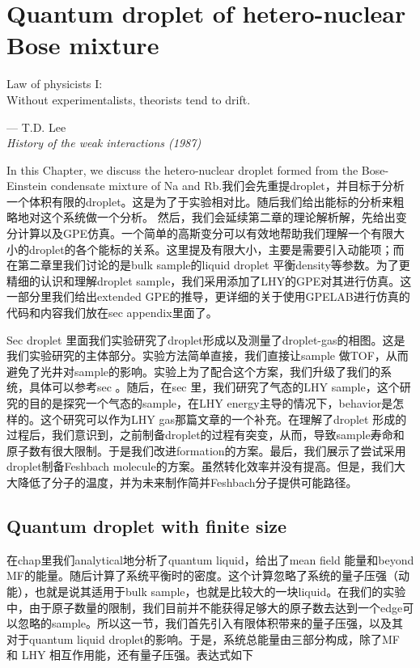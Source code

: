 \chapter{Quantum droplet of hetero-nuclear Bose mixture}
\label{Chap_droplet}

\setlength{\unitlength}{1pt}
\setlength{\epigraphwidth}{10cm}
\epigraph{Law of physicists I: \\ Without experimentalists, theorists tend to drift. \cite{Lee:1992ui}}{--- T.D. Lee\\ \textit{History of the weak interactions (1987)}}

In this Chapter, we discuss the hetero-nuclear droplet formed from the Bose-Einstein condensate mixture of Na and Rb.我们会先重提droplet，并目标于分析一个体积有限的droplet。这是为了于实验相对比。随后我们给出能标的分析来粗略地对这个系统做一个分析。 然后，我们会延续第二章的理论解析解，先给出变分计算以及GPE仿真。一个简单的高斯变分可以有效地帮助我们理解一个有限大小的droplet的各个能标的关系。这里提及有限大小，主要是需要引入动能项；而在第二章里我们讨论的是bulk sample的liquid droplet 平衡density等参数。为了更精细的认识和理解droplet sample，我们采用添加了LHY的GPE对其进行仿真。这一部分里我们给出extended GPE的推导，更详细的关于使用GPELAB进行仿真的代码和内容我们放在sec appendix里面了。

Sec droplet 里面我们实验研究了droplet形成以及测量了droplet-gas的相图。这是我们实验研究的主体部分。实验方法简单直接，我们直接让sample 做TOF，从而避免了光井对sample的影响。实验上为了配合这个方案，我们升级了我们的系统，具体可以参考sec 。随后，在sec 里，我们研究了气态的LHY sample，这个研究的目的是探究一个气态的sample，在LHY energy主导的情况下，behavior是怎样的。这个研究可以作为LHY gas那篇文章的一个补充。在理解了droplet 形成的过程后，我们意识到，之前制备droplet的过程有突变，从而，导致sample寿命和原子数有很大限制。于是我们改进formation的方案。最后，我们展示了尝试采用droplet制备Feshbach molecule的方案。虽然转化效率并没有提高。但是，我们大大降低了分子的温度，并为未来制作简并Feshbach分子提供可能路径。


\section{Quantum droplet with finite size}

在chap里我们analytical地分析了quantum liquid，给出了mean field 能量和beyond MF的能量。随后计算了系统平衡时的密度。这个计算忽略了系统的量子压强（动能），也就是说其适用于bulk sample，也就是比较大的一块liquid。在我们的实验中，由于原子数量的限制，我们目前并不能获得足够大的原子数去达到一个edge可以忽略的sample。所以这一节，我们首先引入有限体积带来的量子压强，以及其对于quantum liquid droplet的影响。于是，系统总能量由三部分构成，除了MF 和 LHY 相互作用能，还有量子压强。表达式如下


